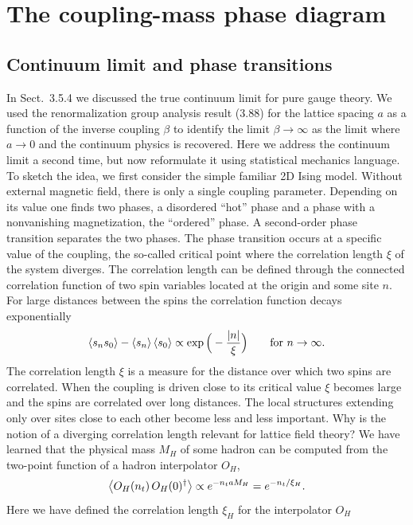 \section{The coupling-mass phase diagram}

\subsection{Continuum limit and phase transitions}

In Sect.~3.5.4 we discussed the true continuum limit for pure gauge theory. We
used the renormalization group analysis result (3.88) for the lattice spacing
$a$ as a function of the inverse coupling $\beta$ to identify the limit
$\beta \to \infty$ as the limit where $a \to 0$ and the continuum physics is
recovered. Here we address the continuum limit a second time, but now
reformulate it using statistical mechanics language.
To sketch the idea, we first consider the simple familiar 2D Ising model.
Without external magnetic field, there is only a single coupling parameter.
Depending on its value one finds two phases, a disordered ``hot'' phase and a
phase with a nonvanishing magnetization, the ``ordered'' phase. A second-order
phase transition separates the two phases. The phase transition occurs at a
specific value of the coupling, the so-called critical point where the
correlation length $\xi$ of the system diverges. The correlation length can be
defined through the connected correlation function of two spin variables
located at the origin and some site $n$. For large distances between the spins
the correlation function decays exponentially
\begin{equation}
\left\langle s_ns_0 \right\rangle - \left\langle s_n \right\rangle\left\langle s_0 \right\rangle \propto \exp\Big(-\frac{|n|}{\xi}\Big)
\qquad \text{for } n \to \infty.
\end{equation}
The correlation length $\xi$ is a measure for the distance over which two spins
are correlated. When the coupling is driven close to its critical value $\xi$
becomes large and the spins are correlated over long distances. The local
structures extending only over sites close to each other become less and less
important.
Why is the notion of a diverging correlation length relevant for lattice field
theory? We have learned that the physical mass $M_H$ of some hadron can be
computed from the two-point function of a hadron interpolator $O_H$,
\begin{equation}
\left\langle O_H(n_t)\,O_H(0)^\dagger \right\rangle \propto e^{-n_t a M_H} = e^{-n_t/\xi_H}.
\end{equation}
Here we have defined the correlation length $\xi_H$ for the interpolator $O_H$
